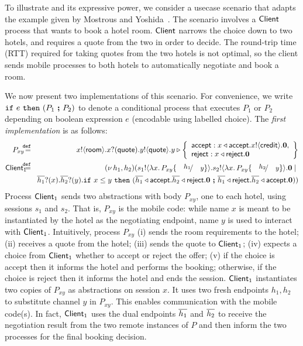 \documentclass[a4paper,UKenglish]{lipics}
\theoremstyle{definition}
\begin{document}
\begin{example}\label{exam:proc}
To illustrate \HOp and its expressive power, 
we consider a usecase scenario that adapts the example given by Mostrous and Yoshida~\cite{tlca07,MostrousY15}.
The scenario involves a $\mathsf{Client}$ process that wants to book
a hotel room. %
$\mathsf{Client}$
narrows the choice down to two hotels, and requires 
 a quote from the two in order to
decide. The round-trip time (RTT) required for
taking quotes from the two hotels is not optimal, %
so the client sends mobile processes to both hotels
to automatically negotiate and book a room. 

We now present two \HOp implementations of this scenario.
For convenience, we write $\mathtt{if}\  e\ \mathtt{then}\  (P_1\ \boldsymbol{;} \ P_2)$ 
to denote a conditional process that executes $P_1$ or $P_2$ depending on boolean expression $e$ (encodable using labelled choice).
The \emph{first implementation} is  as follows:
%
	\begin{eqnarray*}%
		 P_{xy}  \!\!\! & \defeq &  \!\!\! \bout{x}{\rtype} \binp{x}{\Quote} \bout{y}{\Quote}
		y \triangleright \left\{
				\begin{array}{l}
					\accept: \bsel{x}{\accept} \bout{x}{\creditc} \inact,\\
					\reject: \bsel{x}{\reject} \inact
				\end{array}
				\right\}
		\\ %
		 \Client_1 \!\!\!\!\! & \defeq  &  \!\!\! \newsp{h_1, h_2}{\bout{s_1}{\abs{x}{P_{xy} \subst{h_1}{y}}} \bout{s_2}{\abs{x}{P_{xy} \subst{h_2}{y}}} \inact \Par  \\
		& & 
		\!\!\! \binp{\dual{h_1}}{x} \binp{\dual{h_2}}{y}  \If x \leq y\   \Then (\bsel{\dual{h_1}}{\accept} \bsel{\dual{h_2}}{\reject} \inact \ \Else \ \bsel{\dual{h_1}}{\reject} \bsel{\dual{h_2}}{\accept} \inact )
		}
	\end{eqnarray*}
%
Process $\mathsf{Client}_1$ sends two abstractions with body $P_{xy}$, one to each hotel, 
		using sessions $s_1$ and $s_2$.
		That is, $P_{xy}$ is the mobile code:
	while
		name $x$ is meant to be instantiated by the hotel as the negotiating
		endpoint, name $y$ is used to interact with $\mathsf{Client}_1$.	
		Intuitively, process $P_{xy}$ (i)  sends the room requirements to the hotel;
		(ii) receives a quote from the hotel;
		(iii) sends the quote to  $\mathsf{Client}_1$;
		(iv) expects a choice from   $\mathsf{Client}_1$ whether to accept or reject the offer;
		(v) if the choice is accept then it informs the hotel and performs the booking;
		otherwise, if the choice is reject then it informs the hotel and ends the session.
				$\mathsf{Client}_1$ instantiates two copies of  $P_{xy}$ as abstractions
		on session $x$. It uses two
		fresh endpoints $h_1, h_2$ to substitute channel $y$
		in $P_{xy}$. This enables communication with the mobile code(s).
		In fact, 
		$\mathsf{Client}_1$ uses the dual endpoints $\overline{h_1}$ and $\overline{h_2}$
		to receive the negotiation
		result from the two remote instances of $P$ and then inform the two
		processes for the final booking decision.


\end{example}
\end{document}

